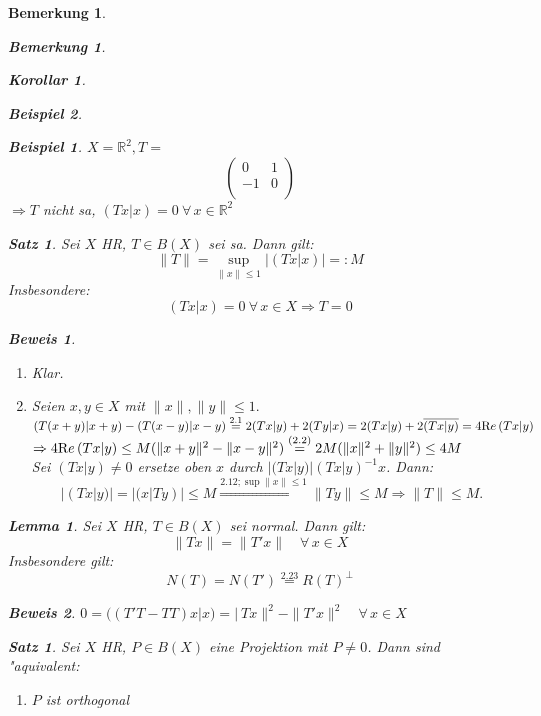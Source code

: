 \documentclass[a4paper,11pt]{book}
\newcommand{\R}{{\mathbb R}}
\newcommand{\re}{\ensuremath{\text Re}\,} %
\newtheorem{Sa}[Def]{Satz}
\newtheorem{Lem}[Def]{Lemma}
\newtheorem{Kor}[Def]{Korollar}
\newtheorem*{BspNO}{Beispiel}
\newtheorem*{BemNO}{Bemerkung}
\newtheorem{Bem}[Def]{Bemerkung}
\theoremstyle{nonumberplain}
\newtheorem{Bew}{Beweis}
\begin{document}
\begin{Bem}
\begin{BemNO}
\begin{Kor}
\begin{BspNO}
\begin{enumerate}
\begin{BspNO}
$X = \R^2, T =$
\[
\left(\begin{array}{rc}
0 & 1 \\
-1 & 0 \\
\end{array} \right)
\]
$\Rightarrow T$ nicht sa, $(Tx|x) = 0 \ \forall\, x \in \R^2$
\end{BspNO}


\begin{Sa}
Sei $X$ HR, $T \in B(X)$ sei sa. Dann gilt:
\[
\| T \| = \sup_{\|x\| \leq 1} \left| (Tx|x) \right| =: M
\]
Insbesondere:
\[
(Tx|x) = 0 \ \forall\, x \in X \Rightarrow T = 0
\]
\end{Sa}

\begin{Bew}\\
\begin{enumerate}
\item["` $\geq$ "'] Klar.

\item["` $\leq$ "'] Seien $x,y \in X$ mit $\|x\|,\|y\| \leq 1.$\\
$(T(x+y)|x+y) - (T(x-y)|x-y) \stackrel{2.1}{=} 2(Tx|y) + 2(Ty|x) = 2(Tx|y) + 2 \overline{(Tx|y)} = 4 \re (Tx|y)$\\
$\Rightarrow 4 \re (Tx|y) \leq M( \|x+y\|^2 - \|x-y\|^2) \stackrel{(2.2)}{=} 2M(\|x\|^2 + \|y\|^2) \leq 4M$\\
Sei $(Tx|y) \not =0$ ersetze oben $x$ durch $|(Tx|y)|(Tx|y)^{-1}x$. Dann:
\[
|(Tx|y)| = |(x|Ty)| \leq M \stackrel{2.12; \sup \|x\| \leq 1}{\Longrightarrow} \|Ty\| \leq M \Longrightarrow \|T\| \leq M.
\]
\end{enumerate}
\end{Bew}


\begin{Lem}
Sei $X$ HR, $T \in B(X)$ sei normal. Dann gilt:
\[
\| Tx \| = \| T'x \| \quad \forall\, x \in X
\]
Insbesondere gilt:
\[
N(T) = N(T') \stackrel{2.23}{=} R(T)^{\bot}
\]
\end{Lem}

\begin{Bew}
$0 = ((T'T-TT)x|x) = |\ Tx \|^2 - \| T'x \|^2 \quad \forall\, x \in X$
\end{Bew}


\begin{Sa}
Sei $X$ HR, $P \in B(X)$ eine Projektion mit $P \not= 0$. Dann sind "aquivalent:
\begin{enumerate}
\item[a)] $P$ ist orthogonal


\end{enumerate}
\end{Sa}
\end{enumerate}
\end{BspNO}
\end{Kor}
\end{BemNO}
\end{Bem}
\end{document}
